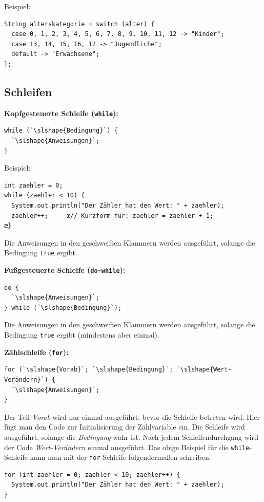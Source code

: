 Beispiel:

\begin{lstlisting}
String alterskategorie = switch (alter) {
  case 0, 1, 2, 3, 4, 5, 6, 7, 8, 9, 10, 11, 12 -> "Kinder";
  case 13, 14, 15, 16, 17 -> "Jugendliche";
  default -> "Erwachsene";
};
\end{lstlisting}

\subsection{Schleifen}

\begin{compactenum}[a)]
\item \textbf{Kopfgesteuerte Schleife (\lstinline|while|):}
\begin{lstlisting}
while (`\slshape{Bedingung}`) {
  `\slshape{Anweisungen}`;
}
\end{lstlisting}

Beispiel:

\begin{lstlisting}
int zaehler = 0;
while (zaehler < 10) {
  System.out.println("Der Zähler hat den Wert: " + zaehler);
  zaehler++;     æ// Kurzform für: zaehler = zaehler + 1;
æ}
\end{lstlisting}

Die Anweisungen in den geschweiften Klammern werden ausgeführt, solange die
Bedingung \lstinline|true| ergibt.

\item \textbf{Fußgesteuerte Schleife (\lstinline|do-while|):}
\begin{lstlisting}
do {
  `\slshape{Anweisungen}`;
} while (`\slshape{Bedingung}`);
\end{lstlisting}

Die Anweisungen in den geschweiften Klammern werden ausgeführt, solange die
Bedingung \lstinline|true| ergibt (mindestens aber einmal).

\item \textbf{Zählschleife (\lstinline|for|):}
\begin{lstlisting}
for (`\slshape{Vorab}`; `\slshape{Bedingung}`; `\slshape{Wert-Verändern}`) {
  `\slshape{Anweisungen}`;
}
\end{lstlisting}

Der Teil \emph{Vorab} wird nur einmal ausgeführt, bevor die Schleife
betreten wird. Hier fügt man den Code zur Initialisierung der Zählvariable ein.
Die Schleife wird ausgeführt, solange die \emph{Bedingung} wahr ist. Nach
jedem Schleifendurchgang wird der Code \emph{Wert-Verändern} einmal
ausgeführt. Das obige Beispiel für die \lstinline|while|-Schleife kann man mit
der \lstinline|for|-Schleife folgendermaßen schreiben:

\begin{lstlisting}
for (int zaehler = 0; zaehler < 10; zaehler++) {
  System.out.println("Der Zähler hat den Wert: " + zaehler);
}
\end{lstlisting}
\end{compactenum}


